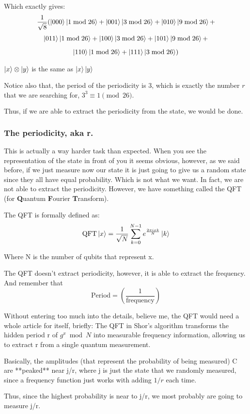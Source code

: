 Which exactly gives:
$$
\frac{1}{\sqrt{8}} (\ket{000} \ket{1 \bmod 26} + \ket{001} \ket{3 \bmod 26} + \ket{010} \ket{9 \bmod 26} +
$$
$$
\ket{011} \ket{1 \bmod 26} + \ket{100} \ket{3 \bmod 26} + \ket{101} \ket{9 \bmod 26} +
$$
$$
\ket{110} \ket{1 \bmod 26} + \ket{111} \ket{3 \bmod 26})
$$

\begin{notebox}
    $\ket{x}\otimes\ket{y}$ is the same as $\ket{x}\ket{y}$
\end{notebox}
Notice also that, the period of the periodicity is 3, which is exactly the number $r$ that we are searching for, $3^3 \equiv 1 \pmod{26}$.

Thus, if we are able to extract the periodicity from the state, we would be done.
 \subsubsection{The periodicity, aka r.}

 This is actually a way harder task than expected. When you see the representation of the state in front of you it seems obvious, however, as we said before, if we just measure now our state it is just going to give us a random state since they all have equal probability. Which is not what we want. In fact, we are not able to extract the periodicity. However, we have something called the QFT (for \textbf{Q}uantum \textbf{F}ourier \textbf{T}ransform).

 The QFT is formally defined as:
$$
\text{QFT} \ket{x} = \frac{1}{\sqrt{N}} \sum_{k=0}^{N-1} e^{\frac{2\pi i x k}{N}} \ket{k}
$$

Where N is the number of qubits that represent x.

The QFT doesn’t extract periodicity, however, it is able to extract the frequency. And remember that
$$
\text{Period} = \left( \frac{1}{\text{frequency}} \right)
$$

Without entering too much into the details, believe me, the QFT would need a whole article for itself, briefly: The QFT in Shor's algorithm transforms the hidden period r of $g^x \bmod N$ into measurable frequency information, allowing us to extract r from a single quantum measurement.

Basically, the amplitudes (that represent the probability of being measured) C are **peaked** near j/r, where j is just the state that we randomly measured, since a frequency function just works with adding $1/r$ each time.

Thus, since the highest probability is near to j/r, we most probably are going to measure j/r.

